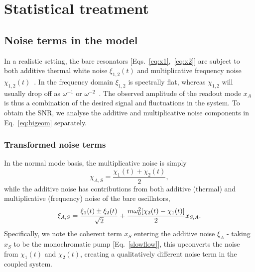 \section{Statistical treatment} \label{sec:spins_stochastic}
\subsection{Noise terms in the model}
In a realistic setting, the bare resonators [Eqs.~\eqref{eq:x1},~\eqref{eq:x2}] are subject to both additive thermal white noise $\xi_{1,2}(t)$ and multiplicative frequency noise $\chi_{1,2}(t)$~\cite{Cleland_2002}. In the frequency domain $\xi_{1,2}$ is spectrally flat, whereas $\chi_{1,2}$ will usually drop off as $\omega^{-1}$ or $\omega^{-2}$~\cite{Fong_2012}. The observed amplitude of the readout mode $x_A$ is thus a combination of the desired signal and fluctuations in the system. To obtain the SNR, we analyse the additive and multiplicative noise components in Eq.~\eqref{eq:bigeom} separately.

\subsubsection{Transformed noise terms} 
In the normal mode basis, the multiplicative noise is simply
\begin{equation}
\chi_{A,S} = \frac{\chi_1(t) + \chi_2(t)}{2},
\end{equation}
while the additive noise has contributions from both additive (thermal) and multiplicative (frequency) noise of the bare oscillators,
\begin{equation}
\xi_{A,S} = \frac{\xi_1(t)\pm\xi_2(t)}{\sqrt{2}}+ \frac{m\omega_0^2[\chi_2(t) - \chi_1(t)] }{2} x_{S,A}. \\
\end{equation}
Specifically, we note the coherent term $x_S$ entering the additive noise $\xi_A$ - taking $x_S$ to be the monochromatic pump [Eq.~\eqref{slowflow}], this upconverts the noise from $\chi_1(t)$ and $\chi_2(t)$, creating a qualitatively different noise term in the coupled system.

